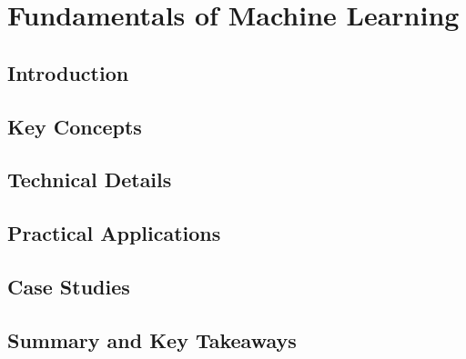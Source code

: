 ﻿%

\chapter{Fundamentals of Machine Learning}
\label{ch:chapter-02}

\section{Introduction}


\section{Key Concepts}


\section{Technical Details}


\section{Practical Applications}


\section{Case Studies}


\section{Summary and Key Takeaways}


